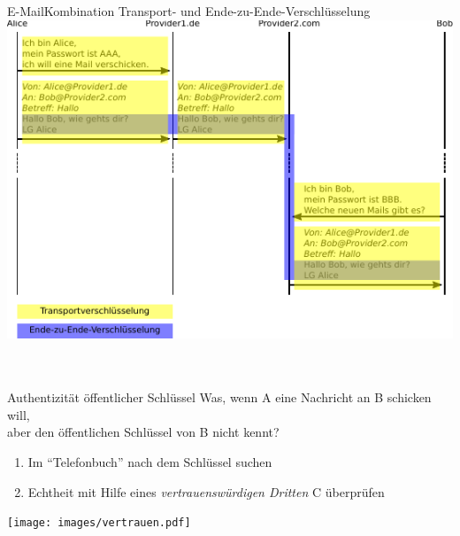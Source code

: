 \begin{frame}{E-Mail}{Kombination Transport- und Ende-zu-Ende-Verschlüsselung}
  \includegraphics[width=.9\textwidth]{images/maildaten_beides.pdf}
  \scriptsize
  ~\\
  ~\\
\end{frame}

\begin{frame}{Authentizität öffentlicher Schlüssel}
Was, wenn A eine Nachricht an B schicken will,\\ aber den öffentlichen Schlüssel von B nicht kennt?\\
\begin{enumerate}
  \item Im ``Telefonbuch'' nach dem Schlüssel suchen
  \item Echtheit mit Hilfe eines \emph{vertrauenswürdigen Dritten} C überprüfen
\end{enumerate}
\begin{center}
  \texttt{[image: images/vertrauen.pdf]}
\end{center}
\end{frame}

